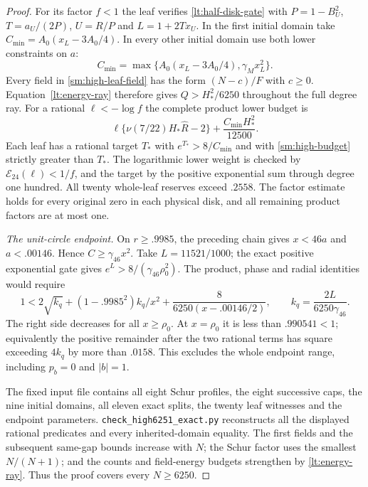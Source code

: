 \documentclass[11pt,reqno]{amsart}
\numberwithin{equation}{section}
\theoremstyle{definition}
\theoremstyle{remark}
\DeclareRobustCommand{\cert}[1]{\nolinkurl{#1}}
\begin{document}
\begin{proof}
For its factor $f<1$ the leaf verifies
\eqref{lt:half-disk-gate} with $P=1-B_U^2$,
$T=a_U/(2P)$, $U=R/P$ and $L=1+2Tx_U$.
In the first initial domain take $C_{\min}=A_0(x_L-3A_0/4)$.
In every other initial domain use both lower constraints on
$a$:
\[
 C_{\min}=\max\{A_0(x_L-3A_0/4),\gamma_Mx_L^2\}.
\]
Every field in \eqref{sm:high-leaf-field} has the form $(N-c)/F$
with $c\ge0$. Equation~\eqref{lt:energy-ray} therefore gives
$Q>H_*^2/6250$ throughout the full degree ray. For a rational
$\ell<-\log f$ the complete product lower budget is
\begin{equation}\label{sm:high-budget}
 \ell\{\nu(7/22)H_*\widehat R-2\}
       +\frac{C_{\min}H_*^2}{12500}.
\end{equation}
Each leaf has a rational target $T_*$ with
$e^{T_*}>8/C_{\min}$ and with
\eqref{sm:high-budget} strictly greater than $T_*$.
The logarithmic lower weight is checked by
$\mathcal E_{24}(\ell)<1/f$, and the target by the positive
exponential sum through degree one hundred. All twenty whole-leaf
reserves exceed $.2558$. The factor estimate holds for every
original zero in each physical disk, and all remaining product
factors are at most one.

\smallskip\noindent\emph{The unit-circle endpoint.}
On $r\ge.9985$, the preceding chain gives $x<46a$ and
$a<.00146$. Hence $C\ge\gamma_{46}x^2$.
Take $L=11521/1000$; the exact positive exponential gate gives
$e^L>8/(\gamma_{46}\rho_0^2)$.
The product, phase and radial identities would require
\[
 1<2\sqrt{k_q}+(1-.9985^2)k_q/x^2
                 +\frac8{6250(x-.00146/2)},\qquad
 k_q=\frac{2L}{6250\gamma_{46}}.
\]
The right side decreases for all $x\ge\rho_0$. At $x=\rho_0$
it is less than $.990541<1$; equivalently the positive remainder
after the two rational terms has square exceeding $4k_q$ by more
than $.0158$. This excludes the whole endpoint range, including
$p_b=0$ and $|b|=1$.

The fixed input file contains all eight Schur profiles, the eight
successive caps, the nine initial domains, all eleven exact splits,
the twenty leaf witnesses and the endpoint parameters.
\cert{check_high6251_exact.py} reconstructs all the displayed
rational predicates and every inherited-domain equality.
The first fields and the subsequent same-gap bounds increase with
$N$; the Schur factor uses the smallest $N/(N+1)$; and the counts
and field-energy budgets strengthen by \eqref{lt:energy-ray}.
Thus the proof covers every $N\ge6250$.
\end{proof}
\end{document}
